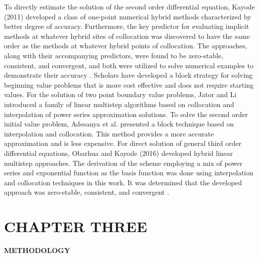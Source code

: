\documentclass[12pt]{report}
\begin{document}
\noindent To directly estimate the solution of the second order differential equation, Kayode (2011) developed a class of one-point numerical hybrid methods characterized by better degree of accuracy. Furthermore, the key predictor for evaluating implicit methods at whatever hybrid sites of collocation was discovered to have the same order as the methods at whatever hybrid points of collocation. The approaches, along with their accompanying predictors, were found to be zero-stable, consistent, and convergent, and both were utilized to solve numerical examples to demonstrate their accuracy \cite{Kayode}.
\noindent Scholars have developed a block strategy for solving beginning value problems that is more cost effective and does not require starting values. For the solution of two point boundary value problems, Jator and Li \cite{Adesanya} introduced a family of linear multistep algorithms based on collocation and interpolation of power series approximation solutions. To solve the second order initial value problem, Adesanya et al.\cite{Adee} presented a block technique based on interpolation and collocation. This method provides a more accurate approximation and is less expensive.
\noindent For direct solution of general third order differential equations, Obarhua and Kayode (2016) developed hybrid linear multistep approaches. The derivation of the scheme employing a mix of power series and exponential function as the basis function was done using interpolation and collocation techniques in this work. It was determined that the developed approach was zero-stable, consistent, and convergent \cite{obarhua}.


\chapter[CHAPTER THREE: METHODOLOGY]{CHAPTER THREE}
\begin{center}
	\Large\textbf{METHODOLOGY}
\end{center}
\end{document}

